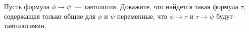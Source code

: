 
Пусть формула $\phi \rightarrow \psi$~--- тавтология. Докажите, что найдется такая
формула $\tau$, содержащая только общие для $\phi$ и $\psi$ переменные, что $\phi
\rightarrow \tau$ и $\tau \rightarrow \psi$ будут тавтологиями.